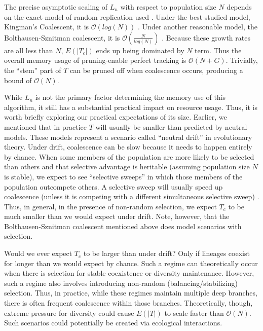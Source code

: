 The precise asymptotic scaling of $L_n$ with respect to population size $N$ depends on the exact model of random replication used \citep{tellierCoalescenceMultipleBranching2014}.
Under the best-studied model, Kingman's Coalescent, it is $\mathcal{O}(log(N))$ \citep{kingmanCoalescent1982, delmasAsymptoticResultsLength2008}.
Under another reasonable model, the Bolthausen-Sznitman coalescent, it is $\mathcal{O}(\frac{N}{log(N)})$ \citep{drmotaAsymptoticResultsConcerning2007}.
Because these growth rates are all less than $N$, $E(|T_c|)$ ends up being dominated by $N$ term.
Thus the overall memory usage of pruning-enable perfect tracking is $\mathcal{O}(N + G)$.
Trivially, the ``stem'' part of $T$ can be pruned off when coalescence occurs, producing a bound of $\mathcal{O}(N)$.

While $L_n$ is not the primary factor determining the memory use of this algorithm, it still has a substantial practical impact on resource usage.
Thus, it is worth briefly exploring our practical expectations of its size.
Earlier, we mentioned that in practice $T$ will usually be smaller than predicted by neutral models.
These models represent a scenario called ``neutral drift'' in evolutionary theory.
Under drift, coalescence can be slow because it needs to happen entirely by chance.
When some members of the population are more likely to be selected than others and that selective advantage is heritable (assuming population size $N$ is stable), we expect to see ``selective sweeps'' in which those members of the population outcompete others.
A selective sweep will usually speed up coalescence (unless it is competing with a different simultaneous selective sweep) \citep{neherGeneticDraftSelective2013}.
Thus, in general, in the presence of non-random selection, we expect $T_c$ to be much smaller than we would expect under drift.
Note, however, that the Bolthausen-Sznitman coalescent mentioned above does model scenarios with selection.

Would we ever expect $T_c$ to be larger than under drift?
Only if lineages coexist for longer than we would expect by chance.
Such a regime can theoretically occur when there is selection for stable coexistence or diversity maintenance.
However, such a regime also involves introducing non-random (balancing/stabilizing) selection.
Thus, in practice, while these regimes maintain multiple deep branches, there is often frequent coalescence within those branches.
Theoretically, though, extreme pressure for diversity could cause $E(|T|)$ to scale faster than $\mathcal{O}(N)$.
Such scenarios could potentially be created via ecological interactions.

